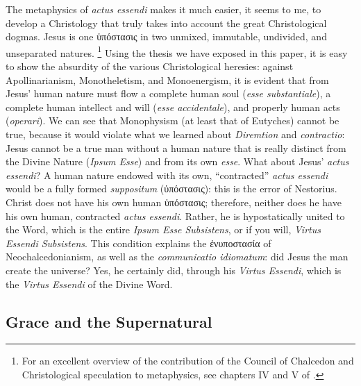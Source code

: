 The metaphysics of \emph{actus essendi} makes it much easier, it seems to me, to develop a Christology that truly takes into account the great Christological dogmas. Jesus is one ὑπόστασις in two unmixed, immutable, undivided, and unseparated natures.%
%
\footnote{For an excellent overview of the contribution of the Council of Chalcedon and Christological speculation to metaphysics, see chapters IV and V of \cite[49–62]{lucas:absoluto}.}
%
Using the thesis we have exposed in this paper, it is easy to show the absurdity of the various Christological heresies: against Apollinarianism, Monotheletism, and Monoenergism, it is evident that from Jesus’ human nature must flow a complete human soul (\emph{esse substantiale}), a complete human intellect and will (\emph{esse accidentale}), and properly human acts (\emph{operari}). We can see that Monophysism (at least that of Eutyches) cannot be true, because it would violate what we learned about \emph{Diremtion} and \emph{contractio}: Jesus cannot be a true man without a human nature that is really distinct from the Divine Nature (\emph{Ipsum Esse}) and from its own \emph{esse}. What about Jesus’ \emph{actus essendi}? A human nature endowed with its own, “contracted” \emph{actus essendi} would be a fully formed \emph{suppositum} (ὑπόστασις): this is the error of Nestorius. Christ does not have his own human ὑπόστασις; therefore, neither does he have his own human, contracted \emph{actus essendi}. Rather, he is hypostatically united to the Word, which is the entire \emph{Ipsum Esse Subsistens}, or if you will, \emph{Virtus Essendi Subsistens}. This condition explains the ἐνυποστασία of Neochalcedonianism, as well as the \emph{communicatio idiomatum}: did Jesus the man create the universe? Yes, he certainly did, through his \emph{Virtus Essendi}, which is the \emph{Virtus Essendi} of the Divine Word.

\subsection{Grace and the Supernatural}
\label{sec:grace}

